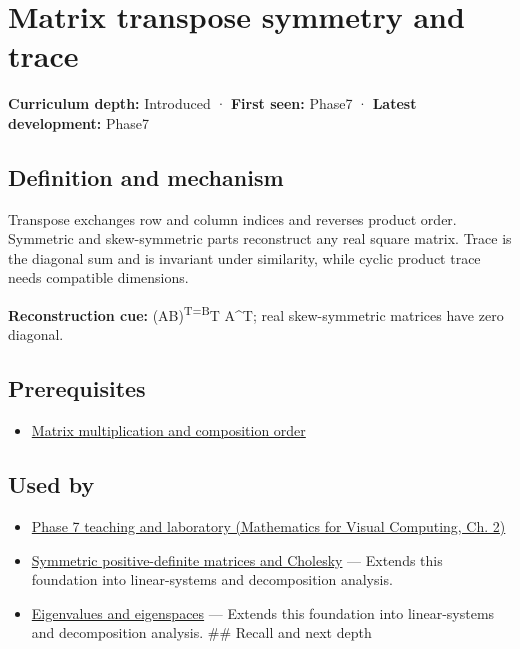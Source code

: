 \hypertarget{appendix-175ca5ff874d}{}\label{referencestart:appendix-175ca5ff874d}
\section{Matrix transpose symmetry and trace}\label{appendix-175ca5ff874d-matrix-transpose-symmetry-and-trace}

\textbf{Curriculum depth:} Introduced · \textbf{First seen:} Phase7 · \textbf{Latest development:} Phase7

\begin{allmightroledefinition}

\subsection{Definition and mechanism}\label{appendix-175ca5ff874d-definition-and-mechanism}

Transpose exchanges row and column indices and reverses product order. Symmetric and skew-symmetric parts reconstruct any real square matrix. Trace is the diagonal sum and is invariant under similarity, while cyclic product trace needs compatible dimensions.

\end{allmightroledefinition}

\textbf{Reconstruction cue:} (AB)\textsuperscript{T=B}T A\^{}T; real skew-symmetric matrices have zero diagonal.

\subsection{Prerequisites}\label{appendix-175ca5ff874d-prerequisites}

\begin{itemize}
\tightlist
\item
  \hyperref[appendix-ab31ef447dbf]{Matrix multiplication and composition order}
\end{itemize}

\subsection{Used by}\label{appendix-175ca5ff874d-used-by}

\begin{itemize}
\tightlist
\item
  \href{../02-Mathematics-for-Visual-Computing/main.pdf\#nameddest=01-foundations-i-ch018-keep-the-promises-visible-while-moving-between-representations}{Phase 7 teaching and laboratory (Mathematics for Visual Computing, Ch. 2)}
\item
  \hyperref[appendix-50d2ea3c9b26]{Symmetric positive-definite matrices and Cholesky} --- Extends this foundation into linear-systems and decomposition analysis.
\item
  \hyperref[appendix-0b3be18411f9]{Eigenvalues and eigenspaces} --- Extends this foundation into linear-systems and decomposition analysis. \#\# Recall and next depth
\end{itemize}

